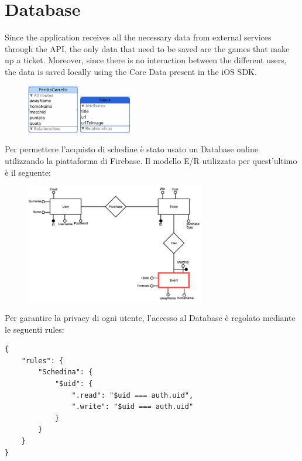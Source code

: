 \documentclass[numbers=noenddot, 12pt, a4paper, oneside]{scrbook}
\begin{document}
\section{Database}
Since the application receives all the necessary data from external services through the API, the only data that need to be saved are the games that make up a ticket. Moreover, since there is no interaction between the different users, the data is saved locally using the Core Data present in the iOS SDK.
\begin{figure}[H]
	\centering
	\includegraphics[width=0.2\textwidth]{images/DatiSchedina}
	\includegraphics[width=0.2\textwidth]{images/DatiNews}
\end{figure}
Per permettere l'acquisto di schedine è stato usato un Database online utilizzando la piattaforma di Firebase. Il modello E/R utilizzato per quest'ultimo è il seguente:
\begin{figure}[H]
	\centering
	\includegraphics[width=0.7\textwidth]{images/ER.png}
\end{figure}
\newpage
Per garantire la privacy di ogni utente, l'accesso al Database è regolato mediante le seguenti rules:
\begin{lstlisting}[style=CStyle]
{
	"rules": {
		"Schedina": {
			"$uid": {
				".read": "$uid === auth.uid",
				".write": "$uid === auth.uid"
			}
		}
	}
}
\end{lstlisting}
\end{document}
